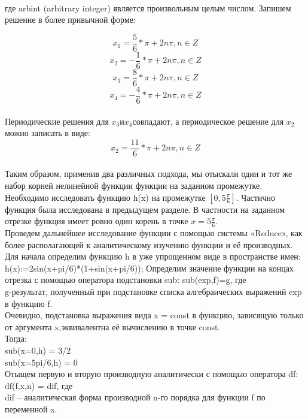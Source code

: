 \documentclass[russian,utf8,nocolumnxxxi,nocolumnxxxii]{eskdtext}
\begin{document}
\begin{figure}[H]
\begin{center}
\begin{minipage}[h]{0.65\linewidth}
  \\
\frametitle{}
\end{minipage}
\end{center}
\end{figure}


где arbint (arbitrary integer) является произвольным целым числом. Запишем решение в более привычной форме:

$$x_1=\frac{5}{6}*\pi+2n\pi,n\in Z$$
$$x_2=-\frac{1}{6}*\pi+2n\pi,n\in Z$$
$$x_3=\frac{8}{6}*\pi+2n\pi,n\in Z$$
$$x_4=-\frac{4}{6}*\pi+2n\pi,n\in Z$$\\
Периодические решения для $x_3$и$x_4$совпадают, а периодическое решение для $x_2$ можно записать в виде:
$$x_2=\frac{11}{6}*\pi+2n\pi,n\in Z$$\\
Таким образом, применив два различных подхода, мы отыскали один и тот же набор корней нелинейной функции
\newpage
{ функции на заданном промежутке.}\\
Необходимо исследовать функцию h(x)  на промежутке $[0,5\frac{\pi}{6}]$.
Частично функция была исследована в предыдущем разделе. В частности на заданном отрезке функция имеет ровно один корень в точке $x=5\frac{\pi}{6}$.\\
Проведем дальнейшее исследование функции с помощью системы «Reduce», как более располагающей к аналитическому изучению функции и её производных. Для начала определим функцию h в уже упрощенном виде в пространстве имен:\\
h(x):=2sin(x+pi/6)*(1+sin(x+pi/6));
Определим значение функции на концах отрезка с помощью оператора подстановки sub:
sub(exp,f)=g, где\\
g-результат, полученный при подстановке списка алгебраических выражений exp в функцию f.\\
Очевидно, подстановка выражения вида x = const в функцию, зависящую только от аргумента x,эквивалентна её вычислению в точке const.\\
Тогда:\\
sub(x=0,h) = 3/2\\
sub(x=5pi/6,h) = 0\\
Отыщем первую и вторую производную аналитически с помощью оператора df:\\
df(f,x,n) = dif, где\\
dif – аналитическая форма производной n-го порядка для функции f по переменной x.\\
\end{document}
